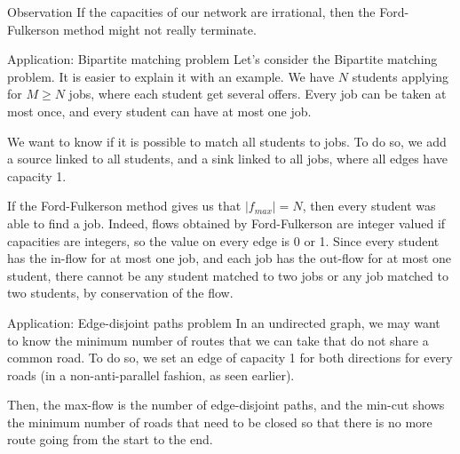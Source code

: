 \documentclass[a4paper]{article}
\begin{document}
\begin{parag}{Observation}
    If the capacities of our network are irrational, then the Ford-Fulkerson method might not really terminate.
\end{parag}

\begin{parag}{Application: Bipartite matching problem}
    Let's consider the Bipartite matching problem. It is easier to explain it with an example. We have $N$ students applying for $M \geq N$ jobs, where each student get several offers. Every job can be taken at most once, and every student can have at most one job.
    

    We want to know if it is possible to match all students to jobs. To do so, we add a source linked to all students, and a sink linked to all jobs, where all edges have capacity 1.



    If the Ford-Fulkerson method gives us that $\left|f_{max}\right| = N$, then every student was able to find a job. Indeed, flows obtained by Ford-Fulkerson are integer valued if capacities are integers, so the value on every edge is 0 or 1. Since every student has the in-flow for at most one job, and each job has the out-flow for at most one student, there cannot be any student matched to two jobs or any job matched to two students, by conservation of the flow.
\end{parag}

\begin{parag}{Application: Edge-disjoint paths problem}
    In an undirected graph, we may want to know the minimum number of routes that we can take that do not share a common road. To do so, we set an edge of capacity 1 for both directions for every roads (in a non-anti-parallel fashion, as seen earlier).

    Then, the max-flow is the number of edge-disjoint paths, and the min-cut shows the minimum number of roads that need to be closed so that there is no more route going from the start to the end.
\end{parag}
\end{document}
